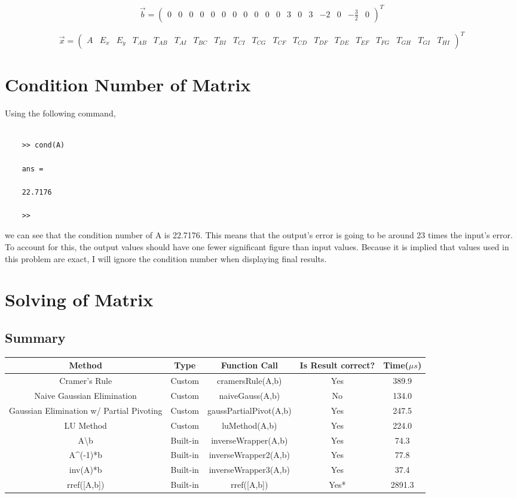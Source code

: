 \documentclass[9pt,letterpaper]{article}
\begin{document}
	\[ \vec{b}= \left(\begin{array}{cccccccccccccccccc} 0 & 0 & 0 & 0 & 0 & 0 & 0 & 0 & 0 & 0 & 0 & 3 & 0 & 3 & -2 & 0 & -\frac{3}{2} & 0 \end{array}\right)^T	\]	
	
	\[ \vec{x}=\left(\begin{array}{ccccccccccccccccccc} A & E_x & E_y & T_{AB} & T_{AB} & T_{AI} & T_{BC} & T_{BI} & T_{CI} & T_{CG} & T_{CF} & T_{CD} & T_{DF} & T_{DE} & T_{EF} & T_{FG} & T_{GH} & T_{GI} & T_{HI}  \end{array} \right)^T \]
	
	
	
	\section{Condition Number of Matrix}
	Using the following command,
	\begin{verbatim}
	
	>> cond(A)
	
	ans =
	
	22.7176
	
	>> 
	\end{verbatim}
	we can see that the condition number of A is 22.7176. This means that the output's error is going to be around 23 times the input's error. To account for this, the output values should have one fewer significant figure than input values. Because it is implied that values used in this problem are exact, I will ignore the condition number when displaying final results.
	\newpage
	\section{Solving of Matrix}
	\subsection{Summary}
	\begin{tabular}{|c|c|c|c|c|}
		\hline
		Method & Type & Function Call & Is Result correct? & Time($\mu s$) \\
		\hline
		Cramer's Rule & Custom & cramersRule(A,b) & Yes  & 389.9 \\
		\hline
		Naive Gaussian Elimination & Custom & naiveGauss(A,b) & No  & 134.0  \\
		\hline
		Gaussian Elimination w/ Partial Pivoting & Custom & gaussPartialPivot(A,b) & Yes  & 247.5  \\
		\hline
		LU Method & Custom & luMethod(A,b) & Yes & 224.0 \\
		\hline
		A\textbackslash b & Built-in & inverseWrapper(A,b) & Yes  & 74.3  \\
		\hline
		A\^{}(-1)*b & Built-in & inverseWrapper2(A,b)  & Yes & 77.8  \\
		\hline
		inv(A)*b & Built-in & inverseWrapper3(A,b) & Yes & 37.4   \\
		\hline
		rref([A,b]) & Built-in & rref([A,b]) & Yes*  & 2891.3  \\
		\hline
	\end{tabular}
\end{document}
